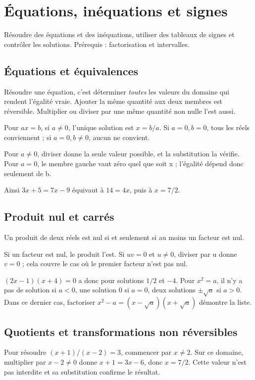 \documentclass[../cours_2de.tex]{subfiles}
\begin{document}
\setcounter{chapter}{5}
\chapter{Équations, inéquations et signes}
\label{sec:ch06}
\begin{objectif}
Résoudre des équations et des inéquations, utiliser des tableaux de signes et contrôler les solutions. Prérequis : factorisation et intervalles.
\end{objectif}
\section{Équations et équivalences}
Résoudre une équation, c'est déterminer \emph{toutes} les valeurs du domaine qui rendent l'égalité vraie. Ajouter la même quantité aux deux membres est réversible. Multiplier ou diviser par une même quantité non nulle l'est aussi.
\begin{propriete}
Pour $ax=b$, si $a\ne0$, l'unique solution est $x=b/a$. Si $a=0,b=0$, tous les réels conviennent ; si $a=0,b\ne0$, aucun ne convient.
\end{propriete}
\begin{demonstration}
Pour $a\ne0$, diviser donne la seule valeur possible, et la substitution la vérifie. Pour $a=0$, le membre gauche vaut zéro quel que soit x ; l'égalité dépend donc seulement de b.
\end{demonstration}
Ainsi $3x+5=7x-9$ équivaut à $14=4x$, puis à $x=7/2$.
\section{Produit nul et carrés}
\begin{propriete}
Un produit de deux réels est nul si et seulement si au moins un facteur est nul.
\end{propriete}
\begin{demonstration}
Si un facteur est nul, le produit l'est. Si $uv=0$ et $u\ne0$, diviser par u donne $v=0$ ; cela couvre le cas où le premier facteur n'est pas nul.
\end{demonstration}
$(2x-1)(x+4)=0$ a donc pour solutions $1/2$ et $-4$.
Pour $x^2=a$, il n'y a pas de solution si $a<0$, une solution $0$ si $a=0$, deux solutions $\pm\sqrt a$ si $a>0$. Dans ce dernier cas, factoriser $x^2-a=(x-\sqrt a)(x+\sqrt a)$ démontre la liste.
\section{Quotients et transformations non réversibles}
Pour résoudre $(x+1)/(x-2)=3$, commencer par $x\ne2$. Sur ce domaine, multiplier par $x-2\ne0$ donne $x+1=3x-6$, donc $x=7/2$. Cette valeur n'est pas interdite et sa substitution confirme le résultat.
\end{document}
